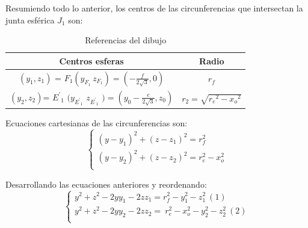        Resumiendo todo lo anterior, los centros de las circunferencias que intersectan la junta esférica $J_{1}$ son:
        \begin{center}
        \renewcommand{\arraystretch}{3.0}
        
            \begin{table}[H]
            \centering
            \begin{tabular}{c c } 
                 \hline
                 \textbf{Centros esferas}  & \textbf{Radio} \\ [0.1ex] 
                 \hline\hline
                         $\left(y_1,z_1\right)$ =
                        $F_1\left(y_{F_1}\,z_{F_1}\right)=\left(-\frac{f}{2\sqrt{3}},0\right)$\textit{} & 
                                                 $r_f$  \\ 
                \hline
                          $(y_2,z_2)$=
                          ${E^'}_{1}$ $(y_{{E^'}_1}$ $z_{{E^'}_1}$ $)=(y_0-\frac{e}{2\sqrt{3}},z_0)$ &
                          $r_2=\sqrt{{r_e}^2-{x_o}^2}$ \\
                \hline
            \end{tabular}
            \caption{Referencias del dibujo}
            \label{tab:anexo_tabla_4}
            \end{table}
        \end{center}

       Ecuaciones cartesianas de las circunferencias son:
        \begin{equation*}
            \left\{ \begin{array}{c}
        	 \left( y-y_{1} \right) ^{2} + \left( z-z_{1} \right) ^{2}= r_{f}^{2}~\\
        	 \left( y-y_{2} \right) ^{2} + \left( z-z_{2} \right) ^{2}=r_{e}^{2}-x_{o}^{2}\\
        	\end{array}\right.
        \end{equation*}
        
        Desarrollando las ecuaciones anteriores y reordenando:
        \begin{equation*}
         \left\{ \begin{array}{c}
        	y^{2}+z^{2}-2yy_{1}-2zz_{1}= r_{f}^{2}-y_{1}^{2}-z_{1}^{2} ~ \left( 1 \right) \\
        	y^{2}+z^{2}-2yy_{2}-2zz_{2}=~ r_{e}^{2}-x_{o}^{2}-y_{2}^{2}-z_{2}^{2}  ~\left( 2 \right) \\
        	\end{array}\right.
        \end{equation*}
        
